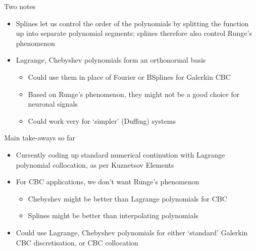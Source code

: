 \documentclass[presentation]{beamer}
\begin{document}
\begin{frame}[label={sec:org0d8ef61}]{Two notes}
\begin{itemize}
\item Splines let us control the order of the polynomials by splitting the function up into separate polynomial segments; splines therefore also control Runge's phenomenon
\end{itemize}
\vfill
\begin{itemize}
\item Lagrange, Chebyshev polynomials form an orthonormal basis
\begin{itemize}
\item Could use them in place of Fourier or BSplines for Galerkin CBC
\item Based on Runge's phenomenon, they might not be a good choice for neuronal signals
\item Could work very for `simpler' (Duffing) systems
\end{itemize}
\end{itemize}
\end{frame}

\begin{frame}[label={sec:org2487660}]{Main take-aways so far}
\begin{itemize}
\item Currently coding up standard numerical continution with Lagrange polynomial collocation, as per Kuznetsov Elements
\end{itemize}
\vfill
\begin{itemize}
\item For CBC applications, we don't want Runge's phenomenon
\begin{itemize}
\item Chebyshev might be better than Lagrange polynomials for CBC
\item Splines might be better than interpolating polynomials
\end{itemize}
\end{itemize}
\vfill
\begin{itemize}
\item Could use Lagrange, Chebyshev polynomials for either `standard' Galerkin CBC discretisation, or CBC collocation
\end{itemize}
\end{frame}
\end{document}
